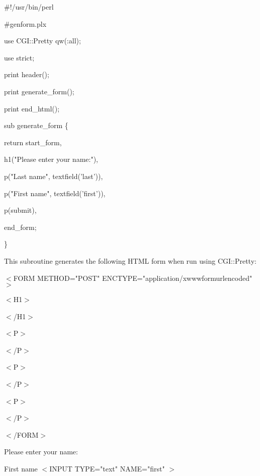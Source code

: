 \documentclass[a4paper,11pt]{book}
\begin{document}
\noindent 

\noindent \#!/usr/bin/perl

\noindent \#genform.plx

\noindent use CGI::Pretty qw(:all);

\noindent use strict;

\noindent 

\noindent print header();

\noindent print generate\_form();

\noindent print end\_html();

\noindent 

\noindent 

\noindent sub generate\_form \{

\noindent return start\_form,

\noindent h1("Please enter your name:"),

\noindent p("Last name", textfield('last')),

\noindent p("First name", textfield('first')),

\noindent p(submit),

\noindent end\_form;

\noindent \}

\noindent 

\noindent This subroutine generates the following HTML form when run using CGI::Pretty:

\noindent 

\noindent $<$FORM METHOD="POST" ENCTYPE="application/xwwwformurlencoded"$>$

\noindent $<$H1$>$

\noindent 

\noindent $<$/H1$>$

\noindent $<$P$>$

\noindent 

\noindent $<$/P$>$

\noindent $<$P$>$

\noindent 

\noindent $<$/P$>$

\noindent $<$P$>$

\noindent 

\noindent $<$/P$>$

\noindent $<$/FORM$>$

\noindent Please enter your name:

\noindent 

\noindent 

\noindent First name $<$INPUT TYPE="text" NAME="first" $>$
\end{document}
